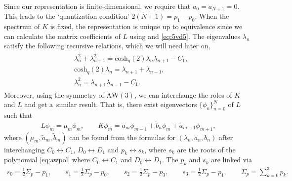 \documentclass[10pt,a4paper]{amsart}
\numberwithin{equation}{section}
\newcommand{\aw}{\mathrm{AW}\!\left(3\right)}
\newcommand{\chq}{\mathrm{cosh}_q}
\newcommand{\half}{\frac{1}{2}}
\begin{document}
Since our representation is finite-dimensional, we require that $a_0=a_{N+1}=0$. This leads to the `quantization condition' $2(N+1)=p_1-p_0$. When the spectrum of $K$ is fixed, the representation is unique up to equivalence since we can calculate the matrix coefficients of $L$ using \cite[equation~(1.12)]{Zhedanov1991} and \eqref{eq:5vd5}. The eigenvalues $\lambda_n$ satisfy the following recursive relations, which we will need later on,
\begin{gather}
\begin{split}
&\lambda_n^2+\lambda_{n+1}^2 = \chq(2)\lambda_n\lambda_{n+1}-C_1, \\
&\chq(2)\lambda_n=\lambda_{n+1}+\lambda_{n-1},\\
&\lambda_n^2=\lambda_{n+1}\lambda_{n-1} -C_1.
\end{split}\label{eq:spectrumrecursiverelations}
\end{gather}
Moreover, using the symmetry of $\aw$, we can interchange the roles of $K$ and $L$ and get a~similar result. That is, there exist eigenvectors $\{\phi_n\}_{n=0}^N$ of $L$ such that
\begin{equation}\label{eq:1vd5omgedraaid}
		L\phi_m=\mu_m \phi_m,\qquad
		K\phi_m=\tilde{a}_m\phi_{m-1}+\tilde{b}_n\phi_m + \tilde{a}_{m+1}\phi_{m+1},
\end{equation}
where $(\mu_m,\tilde{a}_m,\tilde{b}_m)$ can be found from the formulas for $(\lambda_n,a_n,b_n)$ after interchanging $C_0\leftrightarrow C_1$, $D_0\leftrightarrow D_1$ and $p_k\leftrightarrow s_k$, where $s_k$ are the roots of the polynomial \eqref{eq:awpol} where $C_0\leftrightarrow C_1$ and $D_0\leftrightarrow D_1$. The $p_k$ and $s_k$ are linked via
\begin{gather*}
	s_0=\half \Sigma_p - p_1,\qquad\!\! s_1=\half \Sigma_p - p_0,\qquad\!\! s_2=\half \Sigma_p - p_3,\qquad\!\! s_3=\half \Sigma_p - p_1,\qquad\!\! \Sigma_p = \sum_{k=0}^{3}p_k.
\end{gather*}
\end{document}
